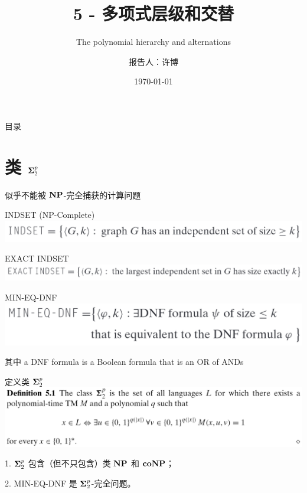 \documentclass[UTF8,aspectratio=169,mathserif]{beamer}
\title{5 - 多项式层级和交替}
\subtitle{The polynomial hierarchy and alternations}
\author{报告人：许博}
\date{\today}
\begin{document}
	
	\begin{frame}
		\titlepage
	\end{frame}
	
	\begin{frame}{目录}
		\tableofcontents
	\end{frame}
	
	\section{类 ${\bf\Sigma}_2^p$}
	\begin{frame}{似乎不能被 $\bf NP$-完全捕获的计算问题}
		\begin{block}{INDSET (NP-Complete)}
			\includegraphics[width=0.6\linewidth]{../../5 & 6/note.assets/image-20210426152232421.png}
		\end{block}
		
		\begin{block}{EXACT INDSET}
			\includegraphics[width=0.7\linewidth]{../../5 & 6/note.assets/image-20210426152349887.png}
		\end{block}
		
		\begin{block}{MIN-EQ-DNF}
			\includegraphics[width=0.6\linewidth]{../../5 & 6/note.assets/image-20210426152757453.png}
			
			其中 a DNF formula is a Boolean formula that is an OR of ANDs 
		\end{block}
	\end{frame}
	
	\begin{frame}{定义类 ${\bf\Sigma}_2^p$}
		\includegraphics[width=\linewidth]{../../5 & 6/note.assets/image-20210426154842170.png}\newline
		
		1. ${\bf\Sigma}_2^p$ 包含（但不只包含）类 $\bf NP$ 和 $\bf coNP$；
		
		2. MIN-EQ-DNF 是 ${\bf\Sigma}_2^p$-完全问题。
	\end{frame}
	
\end{document}
